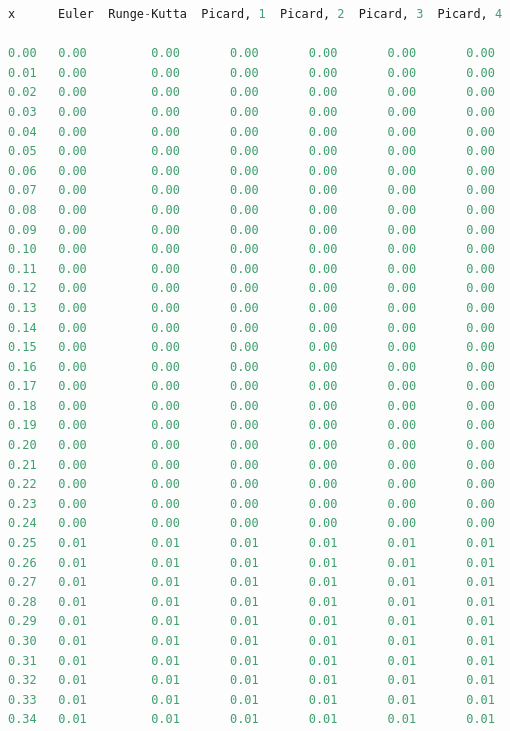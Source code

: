 \documentclass[12pt]{report}
\begin{document}
\begin{lstlisting}[language=Python]
x      Euler  Runge-Kutta  Picard, 1  Picard, 2  Picard, 3  Picard, 4
                                                                  
0.00   0.00         0.00       0.00       0.00       0.00       0.00
0.01   0.00         0.00       0.00       0.00       0.00       0.00
0.02   0.00         0.00       0.00       0.00       0.00       0.00
0.03   0.00         0.00       0.00       0.00       0.00       0.00
0.04   0.00         0.00       0.00       0.00       0.00       0.00
0.05   0.00         0.00       0.00       0.00       0.00       0.00
0.06   0.00         0.00       0.00       0.00       0.00       0.00
0.07   0.00         0.00       0.00       0.00       0.00       0.00
0.08   0.00         0.00       0.00       0.00       0.00       0.00
0.09   0.00         0.00       0.00       0.00       0.00       0.00
0.10   0.00         0.00       0.00       0.00       0.00       0.00
0.11   0.00         0.00       0.00       0.00       0.00       0.00
0.12   0.00         0.00       0.00       0.00       0.00       0.00
0.13   0.00         0.00       0.00       0.00       0.00       0.00
0.14   0.00         0.00       0.00       0.00       0.00       0.00
0.15   0.00         0.00       0.00       0.00       0.00       0.00
0.16   0.00         0.00       0.00       0.00       0.00       0.00
0.17   0.00         0.00       0.00       0.00       0.00       0.00
0.18   0.00         0.00       0.00       0.00       0.00       0.00
0.19   0.00         0.00       0.00       0.00       0.00       0.00
0.20   0.00         0.00       0.00       0.00       0.00       0.00
0.21   0.00         0.00       0.00       0.00       0.00       0.00
0.22   0.00         0.00       0.00       0.00       0.00       0.00
0.23   0.00         0.00       0.00       0.00       0.00       0.00
0.24   0.00         0.00       0.00       0.00       0.00       0.00
0.25   0.01         0.01       0.01       0.01       0.01       0.01
0.26   0.01         0.01       0.01       0.01       0.01       0.01
0.27   0.01         0.01       0.01       0.01       0.01       0.01
0.28   0.01         0.01       0.01       0.01       0.01       0.01
0.29   0.01         0.01       0.01       0.01       0.01       0.01
0.30   0.01         0.01       0.01       0.01       0.01       0.01
0.31   0.01         0.01       0.01       0.01       0.01       0.01
0.32   0.01         0.01       0.01       0.01       0.01       0.01
0.33   0.01         0.01       0.01       0.01       0.01       0.01
0.34   0.01         0.01       0.01       0.01       0.01       0.01

\end{lstlisting}
\end{document}
